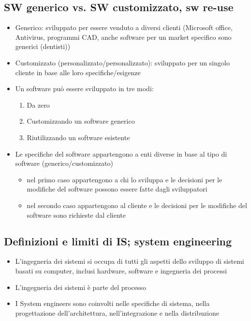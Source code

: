 \subsection{SW generico vs. SW customizzato, sw re-use}
\begin{itemize}
    \item Generico: sviluppato per essere venduto a diversi clienti (Microsoft office, Antivirus, programmi CAD, anche software per un market specifico sono generici (dentisti))
    \item Customizzato (personalizzato/personalizzato): sviluppato per un singolo cliente in base alle loro specifiche/esigenze
    \item Un software può essere sviluppato in tre modi:
    \begin{enumerate}
        \item Da zero
        \item Customizzando un software generico
        \item Riutilizzando un software esistente
    \end{enumerate}
    \item Le specifiche del software appartengono a enti diverse in base al tipo di software (generico/customizzato)
    \begin{itemize}
        \item nel primo caso appartengono a chi lo sviluppa e le decisioni per le modifiche del software possono essere fatte dagli sviluppatori
        \item nel secondo caso appartengono al cliente e le decisioni per le modifiche del software sono richieste dal cliente
    \end{itemize}
\end{itemize}

\subsection{Definizioni e limiti di IS; system engineering}
\begin{itemize}
    \item L'ingegneria dei sistemi si occupa di tutti gli aspetti dello sviluppo di sistemi basati su computer, inclusi hardware, software e ingegneria dei processi
    \item L'ingegneria dei sistemi è parte del processo
    \item I System engineers sono coinvolti nelle specifiche di sistema, nella progettazione dell'architettura, nell'integrazione e nella distribuzione
\end{itemize}

